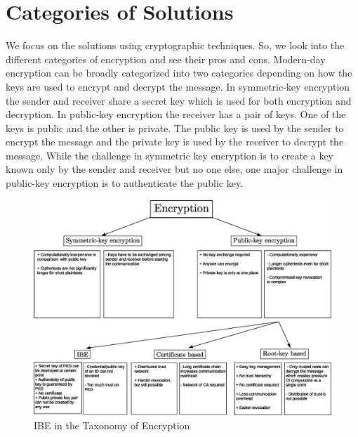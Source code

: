 \documentclass[conference]{IEEEtran}
\begin{document}
\section{Categories of Solutions}
We focus on the solutions using cryptographic techniques. So, we look into the different categories of encryption and see their pros and cons. Modern-day encryption can be broadly categorized into two categories depending on how the keys are used to encrypt and decrypt the message. In symmetric-key encryption the sender and receiver share a secret key which is used for both encryption and decryption. In public-key encryption the receiver has a pair of keys. One of the keys is public and the other is private. The public key is used by the sender to encrypt the message and the private key is used by the receiver to decrypt the message. While the challenge in symmetric key encryption is to create a key known only by the sender and receiver but no one else, one major challenge in public-key encryption is to authenticate the public key.
\begin{figure}
\begin{center}
  \includegraphics[width=.98\textwidth]{ibc_in_jargon_of_crypto.eps}
\caption{IBE in the Taxonomy of Encryption}
\label{fig:ibe_in_the_jargon_of_cryptography}       %
\end{center}
\end{figure}
\end{document}
